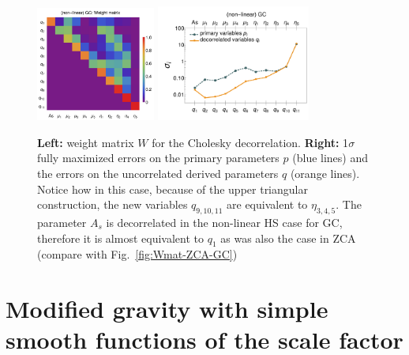 \begin{figure}[htbp]
	\includegraphics[width=0.35\textwidth]{Chapters/linear-nonlinear-MG-forecasts/figures/Decorrelations-GC/Weight_Matrix_Cholesky_SquareNorm--_fiducialMGBin3_Euclid_GC_nonlinearPk__Zhao_.pdf}
	\includegraphics[width=0.45\textwidth]{Chapters/linear-nonlinear-MG-forecasts/figures/Decorrelations-GC/Errors_at_par_index_i--_Cholesky_SquareNorm--fiducialMGBin3_Euclid_GC_nonlinearPk__Zhao_.pdf}
	\caption[Cholesky decorrelation: Weight matrix and uncorrelated errors.]{\textbf{Left:} weight matrix $W$ for the Cholesky decorrelation. \textbf{Right:} 1$\sigma$ fully maximized errors on
		the primary parameters $p$ (blue lines) and the errors on the uncorrelated
		derived parameters $q$ (orange lines). Notice how in this case, because of the upper triangular construction, the new variables
		$q_{9,10,11}$ are equivalent to $\eta_{3,4,5}$. The parameter $A_s$ is decorrelated in the non-linear HS case for GC, therefore
		it is almost equivalent to $q_1$ as was also the case in ZCA (compare with Fig.\ \ref{fig:Wmat-ZCA-GC})
	}\label{fig:Chol-GCnlhs}
\end{figure}


\section{Modified gravity with simple smooth functions of the scale factor}

